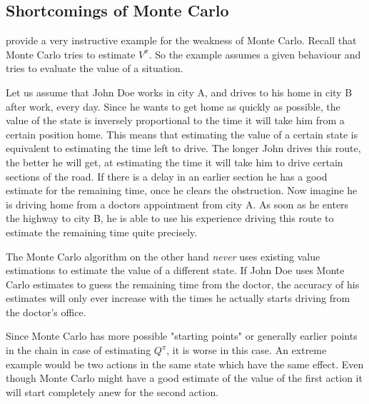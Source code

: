 \subsection{Shortcomings of Monte Carlo}
\citeauthor{suttonReinforcementLearningIntroduction1998} provide a very instructive example for the weakness of Monte Carlo. Recall that Monte Carlo tries to estimate \(V^\pi\). So the example assumes a given behaviour and tries to evaluate the value of a situation.

\begin{example}
	Let us assume that John Doe works in city A, and drives to his home in city B after work, every day. Since he wants to get home as quickly as possible, the value of the state is inversely proportional to the time it will take him from a certain position home. This means that estimating the value of a certain state is equivalent to estimating the time left to drive. The longer John drives this route, the better he will get, at estimating the time it will take him to drive certain sections of the road. If there is a delay in an earlier section he has a good estimate for the remaining time, once he clears the obstruction. Now imagine he is driving home from a doctors appointment from city A. As soon as he enters the highway to city B, he is able to use his experience driving this route to estimate the remaining time quite precisely.

	The Monte Carlo algorithm on the other hand \emph{never} uses existing value estimations to estimate the value of a different state. If John Doe uses Monte Carlo estimates to guess the remaining time from the doctor, the accuracy of his estimates will only ever increase with the times he actually starts driving from the doctor's office. 
\end{example}

Since Monte Carlo has more possible "starting points" or generally earlier points in the chain in case of estimating \(Q^\pi\), it is worse in this case. An extreme example would be two actions in the same state which have the same effect. Even though Monte Carlo might have a good estimate of the value of the first action it will start completely anew for the second action. 

